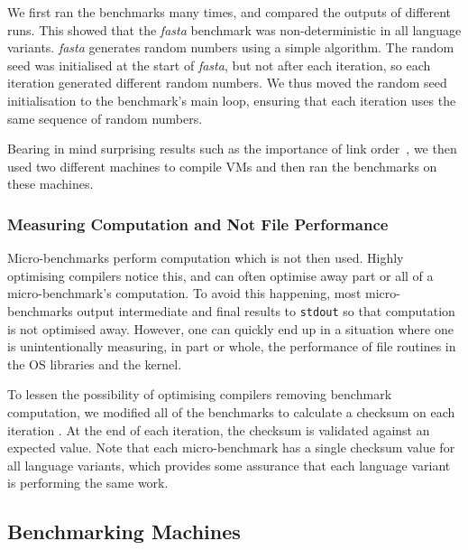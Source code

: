 \documentclass[10pt,preprint]{sigplanconf}
\newcommand{\fasta}{\emph{fasta}\xspace}
\begin{document}
We first ran the benchmarks many  times, and compared the outputs
of different runs. This showed that the \fasta benchmark was non-deterministic
in all language variants. \fasta generates random numbers using a simple
algorithm. The random seed was initialised at the start of \fasta, but not after
each iteration, so each iteration generated different random numbers. We thus
moved the random seed initialisation to the benchmark's main loop, ensuring that
each iteration uses the same sequence of random numbers.

Bearing in mind surprising
results such as the importance of link order~\cite{mytkowicz09surprising}, we
then used two different machines to compile VMs and then ran the benchmarks
on these machines.

\subsubsection{Measuring Computation and Not File Performance}

Micro-benchmarks perform computation which is not then used. Highly optimising
compilers notice this, and can often optimise away part or all of a
micro-benchmark's computation. To avoid this happening, most micro-benchmarks
output intermediate and final results to \texttt{stdout} so that computation is
not optimised away. However, one can quickly end up in a situation where one is
unintentionally measuring, in part or whole, the performance of file routines in
the OS libraries and the kernel.

To lessen the possibility of optimising compilers removing benchmark computation,
we modified all of the benchmarks to calculate a checksum on each iteration
.
At the end of each iteration, the checksum is validated against an expected
value. Note that each micro-benchmark has a single checksum value for all
language variants, which provides some assurance that each language variant is
performing the same work.


\subsection{Benchmarking Machines}
\end{document}
